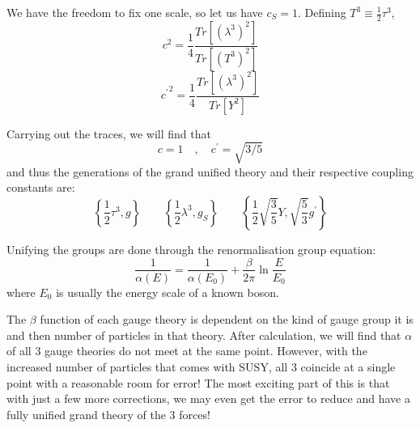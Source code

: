 We have the freedom to fix one scale, so let us have $c_S = 1$. Defining $T^3 \equiv \frac{1}{2} \tau^3$, 
\begin{equation}
    c^2 = \frac{1}{4} \frac{Tr\left[(\lambda^3)^2\right]}{Tr\left[(T^3)^2\right]}
\end{equation}
\begin{equation}
    {c^\prime}^2 = \frac{1}{4} \frac{Tr\left[(\lambda^3)^2\right]}{Tr\left[Y^2\right]}
\end{equation}

Carrying out the traces, we will find that 
\begin{equation}
    c = 1 \quad , \quad c^\prime = \sqrt{3/5}
\end{equation}
and thus the generations of the grand unified theory and their respective coupling constants are:
\begin{equation}
    \left\lbrace \frac{1}{2} \tau^3 , g \right\rbrace \quad \quad \left\lbrace \frac{1}{2} \lambda^3 , g_S \right\rbrace \quad \quad \left\lbrace \frac{1}{2} \sqrt{\frac{3}{5}} Y , \sqrt{\frac{5}{3}} g^\prime \right\rbrace
\end{equation}

Unifying the groups are done through the renormalisation group equation:
\begin{equation}
    \frac{1}{\alpha(E)} = \frac{1}{\alpha(E_0)} + \frac{\beta}{2\pi} \ln \frac{E}{E_0}
\end{equation}
where $E_0$ is usually the energy scale of a known boson.

The $\beta$ function of each gauge theory is dependent on the kind of gauge group it is and then number of particles in that theory. After calculation, we will find that $\alpha$ of all 3 gauge theories do not meet at the same point. However, with the increased number of particles that comes with SUSY, all 3 coincide at a single point with a reasonable room for error! The most exciting part of this is that with just a few more corrections, we may even get the error to reduce and have a fully unified grand theory of the 3 forces!